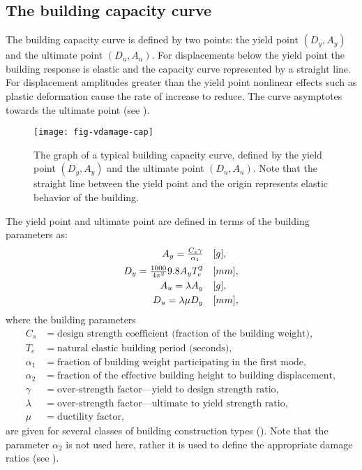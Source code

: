 \subsection{The building capacity curve}

The building capacity curve is defined by two points:
the yield point $(D_y, A_y)$ and the ultimate point $(D_u, A_u)$.
For displacements below the yield point the building response is
elastic and the capacity curve represented
by a straight line. For displacement amplitudes greater than the
yield point nonlinear effects such as plastic deformation cause
the rate of increase to reduce. The curve asymptotes towards the
ultimate point (see ).

\begin{figure}[htp]
\centering
{}
\texttt{[image: fig-vdamage-cap]}
\caption{The graph of a typical building capacity
curve, defined by
  the yield point $(D_y, A_y)$ and the ultimate point $(D_u, A_u)$.
  Note that the straight line between the yield point and the origin
  represents elastic behavior of the building. }
\label{fig:vdamage-cap}
\end{figure}


The yield point and ultimate point are defined in terms of the
building parameters as: $$ \begin{array}{rl}
 A_y = \frac{C_s\gamma}{\alpha_1} & [g],  \vspace{0.5em} \\
 D_y = \frac{1000}{4\pi^2}9.8A_y T_e^2 & [mm],\vspace{0.3em} \\
 A_u = \lambda A_y & [g], \vspace{0.3em} \\
 D_u = \lambda\mu D_y & [mm], \\
 \end{array}
$$
where the building parameters
\begin{align*}
C_s &= \text{design strength coefficient (fraction of the building weight)},\\
T_e &= \text{natural elastic building period (seconds)},\\
\alpha_1 &= \text{fraction of building weight participating in the
  first mode},\\
\alpha_2 &= \text{fraction of the effective building height to
building displacement},\\
\gamma &= \text{over-strength factor---yield to design strength ratio},\\
\lambda &= \text{over-strength factor---ultimate to yield strength ratio},\\
\mu &= \text{ductility factor},
\end{align*}
are given for several classes of building construction types
(). Note that the parameter
$\alpha_2$ is not used here, rather it is used to define the
appropriate damage ratios (see ).


